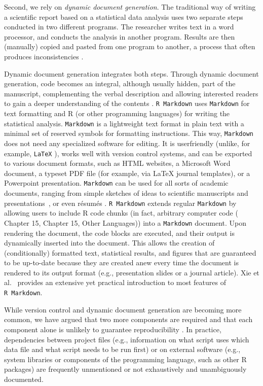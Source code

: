 \documentclass[psych,tutorial,accept,moreauthors,pdftex]{Definitions/mdpi}
\begin{document}
Second, we rely on \emph{dynamic document generation}. The traditional
way of writing a scientific report based on a statistical data analysis
uses two separate steps conducted in two different programs. The
researcher writes text in a word processor, and conducts the analysis in
another program. Results are then (manually) copied and pasted from one
program to another, a process that often produces inconsistencies
\citep{nuijtenPrevalenceStatisticalReporting2016}.

Dynamic document generation integrates both steps. Through dynamic
document generation, code becomes an integral, although usually hidden,
part of the manuscript, complementing the verbal description and
allowing interested readers to gain a deeper understanding of the
contents
\citep{knuthCWEBSystemStructured, claerboutElectronicDocumentsGive1992}.
\texttt{R\ Markdown} uses \texttt{Markdown} for text formatting and R
(or other programming languages) for writing the statistical analysis.
\texttt{Markdown} is a lightweight text format in plain text with a
minimal set of reserved symbols for formatting instructions. This way,
\texttt{Markdown} does not need any specialized software for editing. It
is userfriendly (unlike, for example, \texttt{LaTeX}
\citep{lamportLATEXDocumentPreparation1994}), works well with version
control systems, and can be exported to various document formats, such
as HTML websites, a Microsoft Word document, a typeset PDF file (for
example, via LaTeX journal templates), or a Powerpoint presentation.
\texttt{Markdown} can be used for all sorts of academic documents,
ranging from simple sketches of ideas to scientific manuscripts
\citep{R-rticles} and presentations~\citep{revealjs}, or even résumés
\citep{vitae}. \texttt{R\ Markdown} extends regular \texttt{Markdown} by
allowing users to include R code chunks (in fact, arbitrary computer
code (\citep{xieMarkdownCookbook2020} Chapter 15, Chapter 15, Other
Languages)) into a \texttt{Markdown} document.
Upon rendering the document, the code blocks are executed, and their
output is dynamically inserted into the document. This allows the
creation of (conditionally) formatted text, statistical results, and
figures that are guaranteed to be up-to-date because they are created
anew every time the document is rendered to its output format (e.g.,
presentation slides or a journal article).
Xie et al.~\citep{xieMarkdownCookbook2020} provides an extensive yet practical
introduction to most features of \texttt{R\ Markdown}.

While version control and dynamic document generation are becoming more
common, we have argued that two more components are required and that
each component alone is unlikely to guarantee reproducibility
\citep{Peikert2019, vanlissa2020worcs}. In practice, dependencies
between project files (e.g., information on what script uses which data
file and what script needs to be run first) or on external software
(e.g., system libraries or components of the programming language, such
as other R packages) are frequently unmentioned or not exhaustively and
unambiguously documented.
\end{document}
